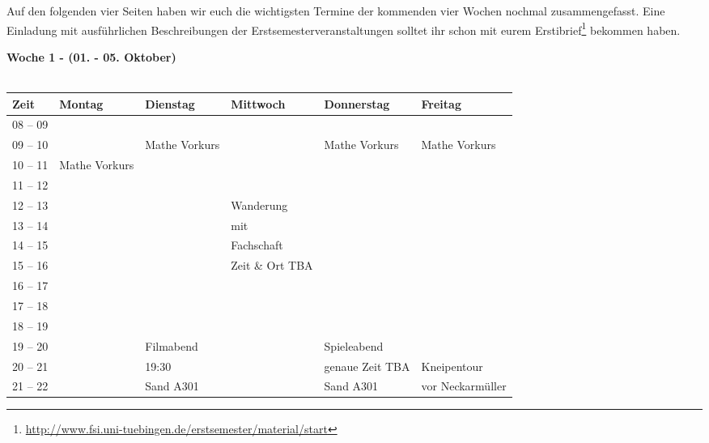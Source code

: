 Auf den folgenden vier Seiten haben wir euch die wichtigsten Termine der kommenden vier Wochen nochmal zusammengefasst. Eine Einladung mit ausführlichen Beschreibungen der Erstsemesterveranstaltungen solltet ihr schon mit eurem Erstibrief\footnote{\url{http://www.fsi.uni-tuebingen.de/erstsemester/material/start}} bekommen haben.
\vfill




\textbf{Woche 1 - (01. - 05. Oktober)}\\
\\
\begin{tabular}{|l|p{}|p{}|p{}|p{}|p{}|} \hline
 Zeit & Montag & Dienstag & Mittwoch & Donnerstag & Freitag \\ 
 \hline \hline
 08 -- 09 & & & & & \\ \cline{1-1} \cline{3-3}\cline{5-6}
 09 -- 10 & & \footnotesize{Mathe Vorkurs} & & \footnotesize{Mathe Vorkurs} & \footnotesize{Mathe Vorkurs} \\ \cline{1-2}
 10 -- 11 & \footnotesize{Mathe Vorkurs} & & & & \\ \cline{1-1}
 11 -- 12 & & & & & \\ \cline{1-1}\cline{4-4}
 12 -- 13 & & & \cellcolor{lightlightgray} \footnotesize{Wanderung} & & \\ \cline{1-1}
 13 -- 14 & & & \cellcolor{lightlightgray} \footnotesize{mit} & & \\ \cline{1-1}
 14 -- 15 & & & \cellcolor{lightlightgray} \footnotesize{Fachschaft} & & \\ \cline{1-1}
 15 -- 16 & & & \cellcolor{lightlightgray} \scriptsize{Zeit \& Ort TBA} & & \\ \cline{1-3} \cline{5-6}
 16 -- 17 & & & \cellcolor{lightlightgray} & & \\ \cline{1-1}
 17 -- 18 & & & \cellcolor{lightlightgray} & & \\ \cline{1-1}
 18 -- 19 & & & \cellcolor{lightlightgray} & & \\ \cline{1-1} \cline{3-3} \cline{5-5}
 19 -- 20 & & \cellcolor{lightlightgray} \footnotesize{Filmabend} & \cellcolor{lightlightgray} & \cellcolor{lightlightgray} \footnotesize{Spieleabend} & \\ \cline{1-1} \cline{4-4}\cline{6-6}
 20 -- 21 & & \cellcolor{lightlightgray} \scriptsize{19:30} & & \cellcolor{lightlightgray} \scriptsize{genaue Zeit TBA} & \cellcolor{lightlightgray} \footnotesize{Kneipentour} \\ \cline{1-1}
 21 -- 22 & & \cellcolor{lightlightgray} \scriptsize{Sand A301} & & \cellcolor{lightlightgray} \scriptsize{Sand A301} & \cellcolor{lightlightgray} \scriptsize{vor Neckarmüller}\\ \hline
 \end{tabular}
\vfil

